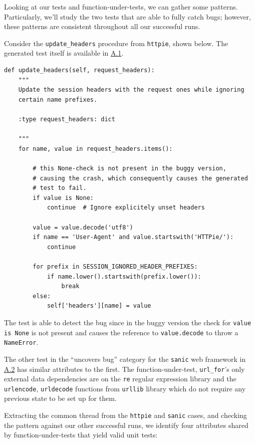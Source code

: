 Looking at our tests and function-under-tests, we can gather some patterns. Particularly, we'll study the two tests
that are able to fully catch bugs; however, these patterns are consistent throughout all our successful runs.


Consider the \verb|update_headers| procedure from \verb|httpie|, shown below. The generated test
itself is available in \hyperref[sec:httpie-fully-functional-ut]{A.1}.

\begin{verbatim}
def update_headers(self, request_headers):
    """
    Update the session headers with the request ones while ignoring
    certain name prefixes.

    :type request_headers: dict

    """
    for name, value in request_headers.items():

        # this None-check is not present in the buggy version,
        # causing the crash, which consequently causes the generated
        # test to fail.
        if value is None:
            continue  # Ignore explicitely unset headers

        value = value.decode('utf8')
        if name == 'User-Agent' and value.startswith('HTTPie/'):
            continue

        for prefix in SESSION_IGNORED_HEADER_PREFIXES:
            if name.lower().startswith(prefix.lower()):
                break
        else:
            self['headers'][name] = value
\end{verbatim}

The test is able to detect the bug since in the buggy version the check for \verb|value is None|
is not present and causes the reference to \verb|value.decode| to throw a \verb|NameError|.

The other test in the ``uncovers bug'' category for the \verb|sanic| web framework in \hyperref[sec:sanic-fully-functional-ut]{A.2}
has similar attributes to the first. The function-under-test, \verb|url_for|'s only external data dependencies are on the \verb|re|
regular expression library and the \verb|urlencode|, \verb|urldecode| functions from \verb|urllib| library which do not require
any previous state to be set up for them.

Extracting the common thread from the \verb|httpie| and \verb|sanic| cases, and checking the pattern against
our other successful runs, we identify four attributes shared by function-under-tests that yield valid unit tests:

